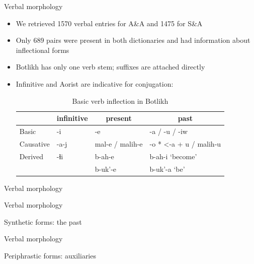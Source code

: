 \begin{frame}{Verbal morphology}

\begin{itemize}
    \item We retrieved 1570 verbal entries for A\&A and 1475 for S\&A 
    \item Only 689 pairs were present in both dictionaries and had information about inflectional forms
    \pause 
    \item Botlikh has only one verb stem; suffixes are attached directly
    \item Infinitive and Aorist are indicative for conjugation:
    \pause

\begin{table}[h]
\caption{Basic verb inflection in Botlikh}
\label{tab:verbtense}
\label{tab:my-table}
\begin{tabular}{l|l|l|l}
          & \multicolumn{1}{c|}{infinitive} & \multicolumn{1}{c|}{present} & \multicolumn{1}{c}{past}        \\ \hline
Basic     & -i                              & -e                           & -a / -u / -iw                   \\
Causative & -a-j                            & mal-e / malih-e              & -o * \textless -a + u / malih-u \\
Derived   & -ɬi                             & b-ah-e                       & b-ah-i `become'                 \\
          &                                 & b-uk'-e                      & b-uk'-a `be'                   
\end{tabular}
\end{table}
\end{itemize}

\end{frame}


\begin{frame}{Verbal morphology}


\end{frame}

\begin{frame}{Verbal morphology}

Synthetic forms: the past


\end{frame}

\begin{frame}{Verbal morphology}

Periphrastic forms: auxiliaries


\end{frame}



